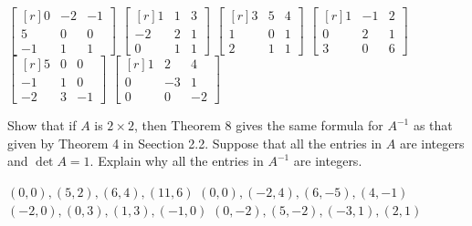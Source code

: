 \documentclass[11pt,answers]{exam} %
\newcommand{\mat}[1]{\begin{bmatrix*}[r] #1 \end{bmatrix*}}
\begin{document}
\begin{questions}
    \question $\mat{0 & -2 & -1 \\ 5 & 0 & 0 \\ -1 & 1 & 1}$
    \question $\mat{1 & 1 & 3 \\ -2 & 2 & 1 \\ 0 & 1 & 1}$
    \question $\mat{3 & 5 & 4 \\ 1 & 0 & 1 \\ 2 & 1 & 1}$
    \question $\mat{1 & -1 & 2 \\ 0 & 2 & 1 \\ 3 & 0 & 6}$
    \question $\mat{5 & 0 & 0 \\ -1 & 1 & 0 \\ -2 & 3 & -1}$
    \question $\mat{1 & 2 & 4 \\ 0 & -3 & 1 \\ 0 & 0 & -2}$

    \question Show that if $A$ is $2 \times 2$, then Theorem 8 gives the same formula for $A^{-1}$ as that given by Theorem 4 in Seection 2.2.
    \question Suppose that all the entries in $A$ are integers and $\det{A}=1$. Explain why all the entries in $A^{-1}$ are integers.
    
    \question $(0,0), (5,2), (6,4), (11,6)$
    \question $(0,0), (-2,4),(6,-5),(4,-1)$
    \question $(-2,0), (0,3), (1,3), (-1,0)$
    \question $(0,-2), (5,-2), (-3,1), (2,1)$


\end{questions}
\end{document}
